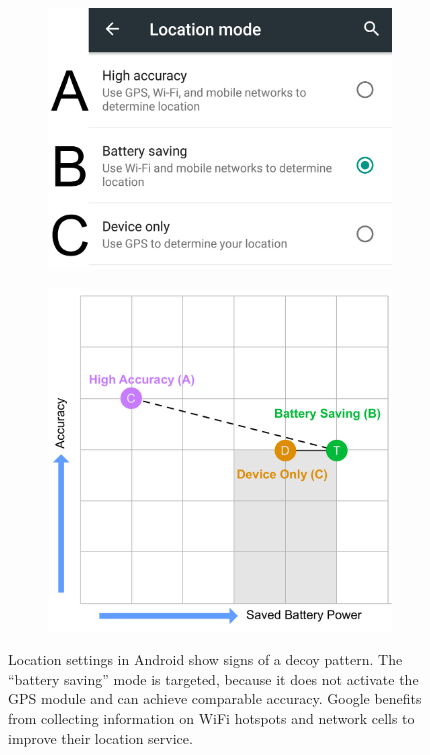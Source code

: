 \begin{figure}
	\centering
	\begin{subfigure}[!t]{0.49\textwidth}
		\includegraphics[width=\textwidth]{figures/decoy/Android_Location_Decoy}
	\end{subfigure}
	\begin{subfigure}[!t]{0.49\textwidth}
		\includegraphics[width=\textwidth]{figures/decoy/decoy-dimensions-android}
	\end{subfigure}
	\caption{\label{fig:decoy:android-pattern}Location settings in Android show signs of a decoy pattern. The ``battery saving'' mode is targeted, because it does not activate the GPS module and can achieve comparable accuracy. Google benefits from collecting information on WiFi hotspots and network cells to improve their location service.} 
\end{figure}


